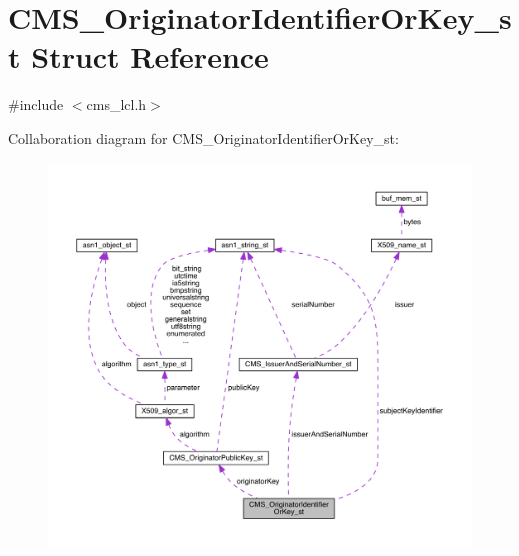\hypertarget{struct_c_m_s___originator_identifier_or_key__st}{}\section{C\+M\+S\+\_\+\+Originator\+Identifier\+Or\+Key\+\_\+st Struct Reference}
\label{struct_c_m_s___originator_identifier_or_key__st}


{\ttfamily \#include $<$cms\+\_\+lcl.\+h$>$}



Collaboration diagram for C\+M\+S\+\_\+\+Originator\+Identifier\+Or\+Key\+\_\+st\+:\nopagebreak
\begin{figure}[H]
\begin{center}
\leavevmode
\includegraphics[width=350pt]{struct_c_m_s___originator_identifier_or_key__st__coll__graph}
\end{center}
\end{figure}
